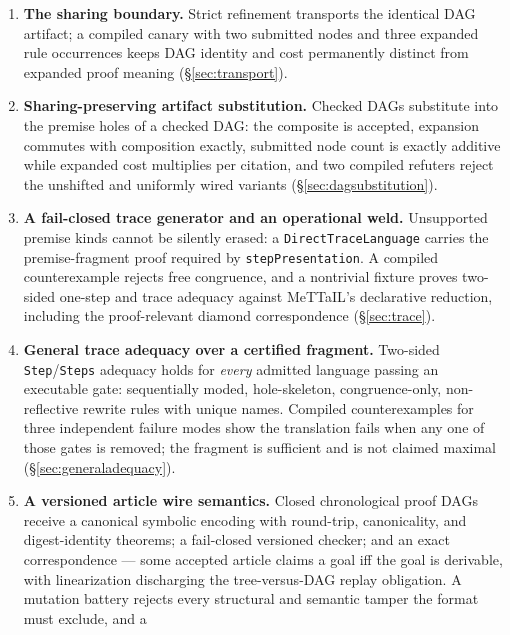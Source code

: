\documentclass[]{article}
\theoremstyle{remark}
\newcommand{\code}[1]{\texttt{#1}}
\newcommand{\MeTTaIL}{\textup{MeTTaIL}}
\begin{document}
\begin{enumerate}
  proof trees and chronological open proof DAGs (premise references plus
  backward node references), with \emph{exact} reconstruction: acceptance
  yields a typed open derivation whose erasure is the submitted artifact,
  and every erasure is accepted (\S\ref{sec:checker},
  \S\ref{sec:dag}).
\item \textbf{The sharing boundary.}  Strict refinement transports the
  identical DAG artifact; a compiled canary with two submitted nodes and
  three expanded rule occurrences keeps DAG identity and cost permanently
  distinct from expanded proof meaning (\S\ref{sec:transport}).
\item \textbf{Sharing-preserving artifact substitution.}  Checked DAGs
  substitute into the premise holes of a checked DAG: the composite is
  accepted, expansion commutes with composition exactly, submitted node
  count is exactly additive while expanded cost multiplies per citation,
  and two compiled refuters reject the unshifted and uniformly wired
  variants (\S\ref{sec:dagsubstitution}).
\item \textbf{A fail-closed trace generator and an operational weld.}
  Unsupported premise kinds cannot be silently erased: a
  \code{DirectTraceLanguage} carries the premise-fragment proof required by
  \code{stepPresentation}.  A compiled counterexample rejects free
  congruence, and a nontrivial fixture proves two-sided one-step and trace
  adequacy against \MeTTaIL{}'s declarative reduction, including the
  proof-relevant diamond correspondence (\S\ref{sec:trace}).
\item \textbf{General trace adequacy over a certified fragment.}  Two-sided
  \code{Step}/\code{Steps} adequacy holds for \emph{every} admitted
  language passing an executable gate: sequentially moded, hole-skeleton,
  congruence-only, non-reflective rewrite rules with unique names.  Compiled
  counterexamples for three independent failure modes show the translation
  fails when any one of those gates is removed; the fragment is sufficient
  and is not claimed maximal (\S\ref{sec:generaladequacy}).
\item \textbf{A versioned article wire semantics.}  Closed chronological
  proof DAGs receive a canonical symbolic encoding with round-trip,
  canonicality, and digest-identity theorems; a fail-closed versioned
  checker; and an exact correspondence --- some accepted article claims a
  goal iff the goal is derivable, with linearization discharging the
  tree-versus-DAG replay obligation.  A mutation battery rejects every
  structural and semantic tamper the format must exclude, and a

\end{enumerate}
\end{document}
